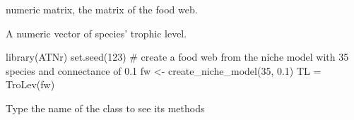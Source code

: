 \documentclass[letterpaper]{book}
\begin{document}
%
\begin{Arguments}
\begin{ldescription}
\item[\code{fw}] numeric matrix, the matrix of the food web.
\end{ldescription}
\end{Arguments}
%
\begin{Value}
A numeric vector of species' trophic level.
\end{Value}
%
\begin{Examples}
\begin{ExampleCode}
library(ATNr)
set.seed(123)
# create a food web from the niche model with 35 species and connectance of 0.1
fw <- create_niche_model(35, 0.1)
TL = TroLev(fw)
 

\end{ExampleCode}
\end{Examples}
%
\begin{Description}\relax
Type the name of the class to see its methods
\end{Description}
%
\end{document}

